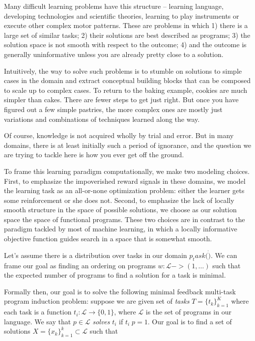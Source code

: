 \documentclass{article}
\begin{document}
Many difficult learning problems have this structure -- learning
language, developing technologies and scientific theories, learning to
play instruments or execute other complex motor patterns. These are
problems in which 1) there is a large set of similar tasks; 2) their
solutions are best described as programs; 3) the solution space is
not smooth with respect to the outcome; 4) and the outcome is generally
uninformative unless you are already pretty close to a solution.

Intuitively, the way to solve such problems is to stumble on solutions
to simple cases in the domain and extract conceptual building blocks
that can be composed to scale up to complex cases. To return to the
baking example, cookies are much simpler than cakes. There are fewer
steps to get just right. But once you have figured out a few simple
pastries, the more complex ones are mostly just variations and
combinations of techniques learned along the way. 

Of course, knowledge is not acquired wholly by trial and error. But in
many domains, there is at least initially such a period of ignorance,
and the question we are trying to tackle here is how you ever get off
the ground.

To frame this learning paradigm computationally, we make two modeling
choices. First, to emphasize the impoverished reward signals in these
domains, we model the learning task as an all-or-none optimization
problem: either the learner gets some reinforcement or she does
not. Second, to emphasize the lack of locally smooth structure in the
space of possible solutions, we choose as our solution space the space
of functional programs. These two choices are in contrast to the
paradigm tackled by most of machine learning, in which a locally
informative objective function guides search in a space that is
somewhat smooth.

Let's assume there is a distribution over tasks in our domain
$p_task(\dot)$. We can frame our goal as finding an ordering on
programs $w : \mathcal{L} -> (1, \dots)$ such that the expected number
of programs to find a solution for a task is minimal. 

Formally then, our goal is to solve the following minimal feedback
multi-task program induction problem: suppose we are
given set of \emph{tasks} $T=\{t_k\}_{k=1}^K$ where each task is a
function $t_i : \mathcal{L} \rightarrow \{0, 1\}$, where $\mathcal{L}$
is the set of programs in our language.  We say that $ p \in
\mathcal{L}$ \emph{solves} $t_i$ if $ t_i\; p = 1$. Our
goal is to find a set of solutions $X = \{x_k\}_{k=1}^k \subset
\mathcal{L}$ such that
\end{document}
